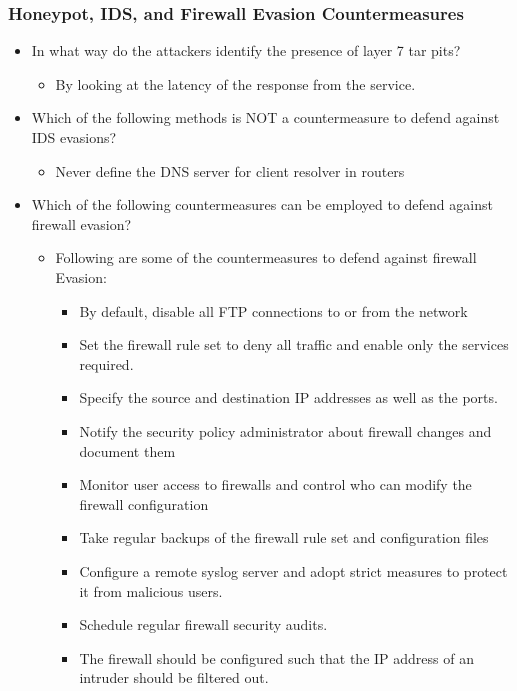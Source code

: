 \subsubsection{Honeypot, IDS, and Firewall Evasion Countermeasures}
\begin{itemize}
    \item In what way do the attackers identify the presence of layer 7 tar pits?
    \begin{itemize}
        \item By looking at the latency of the response from the service.
    \end{itemize}
    \item Which of the following methods is NOT a countermeasure to defend against IDS evasions?
    \begin{itemize}
        \item Never define the DNS server for client resolver in routers
    \end{itemize}
    \item Which of the following countermeasures can be employed to defend against firewall evasion?
    \begin{itemize}
        \item Following are some of the countermeasures to defend against firewall Evasion:
        \begin{itemize}
            \item By default, disable all FTP connections to or from the network
            \item Set the firewall rule set to deny all traffic and enable only the services required.
            \item Specify the source and destination IP addresses as well as the ports.
            \item Notify the security policy administrator about firewall changes and document them
            \item Monitor user access to firewalls and control who can modify the firewall configuration
            \item Take regular backups of the firewall rule set and configuration files
            \item Configure a remote syslog server and adopt strict measures to protect it from malicious users.
            \item Schedule regular firewall security audits.
            \item The firewall should be configured such that the IP address of an intruder should be filtered out.
        \end{itemize}
    \end{itemize}
\end{itemize}

